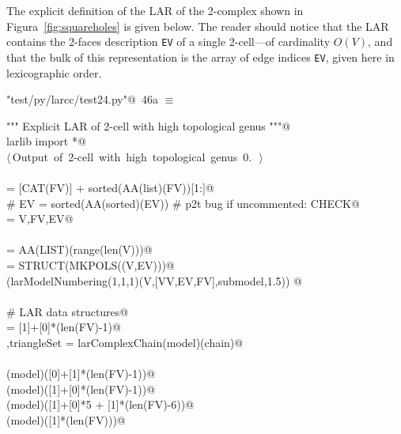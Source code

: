 \documentclass[11pt,oneside]{article}    %
\begin{document}
The explicit definition of the LAR of the 2-complex shown in Figura~\ref{fig:squareholes} is given below. The reader should notice that the LAR contains the 2-faces description \texttt{EV} of a single 2-cell---of cardinality $O(V)$, and that the bulk of this representation is the array of edge indices \texttt{EV}, given here in lexicographic order.

\begin{flushleft} \small \label{scrap77}
\protect{}\verb@"test/py/larcc/test24.py"@\nobreak\ {\footnotesize 46a }$\equiv$
\vspace{-1ex}
\begin{list}{}{} \item
\mbox{}\verb@""" Explicit LAR of 2-cell with high topological genus """@\\
\mbox{}\verb@from larlib import *@\\
\mbox{}\verb@@\hbox{$\langle\,$Output of 2-cell with high topological genus 0.\nobreak\ {\footnotesize {}}$\,\rangle$}\verb@@\\
\mbox{}\verb@@\\
\mbox{}\verb@FV = [CAT(FV)] + sorted(AA(list)(FV))[1:]@\\
\mbox{}\verb@# EV = sorted(AA(sorted)(EV))  # p2t bug if uncommented: CHECK@\\
\mbox{}\verb@model = V,FV,EV@\\
\mbox{}\verb@@\\
\mbox{}\verb@VV = AA(LIST)(range(len(V)))@\\
\mbox{}\verb@submodel = STRUCT(MKPOLS((V,EV)))@\\
\mbox{}\verb@VIEW(larModelNumbering(1,1,1)(V,[VV,EV,FV],submodel,1.5)) @\\
\mbox{}\verb@@\\
\mbox{}\verb@# LAR data structures@\\
\mbox{}\verb@chain = [1]+[0]*(len(FV)-1)@\\
\mbox{}\verb@outModel,triangleSet = larComplexChain(model)(chain)@\\
\mbox{}\verb@@\\
\mbox{}\verb@viewLarComplexChain(model)([0]+[1]*(len(FV)-1))@\\
\mbox{}\verb@viewLarComplexChain(model)([1]+[0]*(len(FV)-1))@\\
\mbox{}\verb@viewLarComplexChain(model)([1]+[0]*5 + [1]*(len(FV)-6))@\\
\mbox{}\verb@viewLarComplexChain(model)([1]*(len(FV)))@\\
\mbox{}\verb@@{\NWsep}
\end{list}
\vspace{-2ex}
\end{flushleft}
\end{document}
